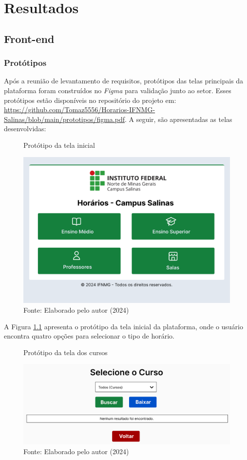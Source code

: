 \chapter{Resultados} 
\label{cap5_resultados}

\section{Front-end}

\subsection{Protótipos}

Após a reunião de levantamento de requisitos, protótipos das telas principais da plataforma foram construídos no \textit{Figma} para validação junto ao setor. Esses protótipos estão disponíveis no repositório do projeto em: \url{https://github.com/Tomaz5556/Horarios-IFNMG-Salinas/blob/main/prototipos/figma.pdf}. A seguir, são apresentadas as telas desenvolvidas:

\begin{figure}[htb]
    \centering
    \caption{Protótipo da tela inicial}
    \includegraphics[width=1\textwidth]{Figuras/proto-1.png}
    \caption*{Fonte: Elaborado pelo autor (2024)}
    \label{fig_proto_1}
\end{figure}

A Figura \ref{fig_proto_1} apresenta o protótipo da tela inicial da plataforma, onde o usuário encontra quatro opções para selecionar o tipo de horário.

\begin{figure}[H]
    \centering
    \caption{Protótipo da tela dos cursos}
    \includegraphics[width=1\textwidth]{Figuras/proto-2.PNG}
    \caption*{Fonte: Elaborado pelo autor (2024)}
    \label{fig_proto_2}
\end{figure}

